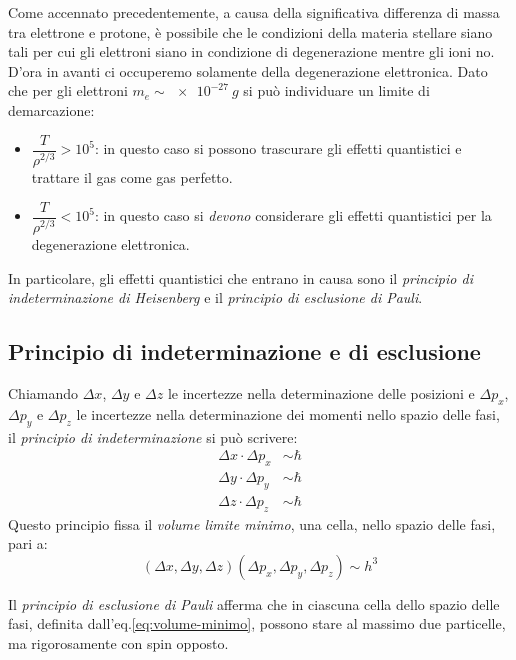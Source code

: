 Come accennato precedentemente, a causa della significativa differenza di massa tra elettrone e protone, è possibile che le condizioni della materia stellare siano tali per cui gli elettroni siano in condizione di degenerazione mentre gli ioni no. D'ora in avanti ci occuperemo solamente della degenerazione elettronica. Dato che per gli elettroni $m_e \sim \SI{e-27}{g}$ si può individuare un limite di demarcazione:
\begin{itemize}
    \item $\dfrac{T}{\rho^{2/3}} > 10^5$: in questo caso si possono trascurare gli effetti quantistici e trattare il gas come gas perfetto.
    \item $\dfrac{T}{\rho^{2/3}} < 10^5$: in questo caso si \emph{devono} considerare gli effetti quantistici per la degenerazione elettronica.
\end{itemize}

In particolare, gli effetti quantistici che entrano in causa sono il \emph{principio di indeterminazione di Heisenberg} e il \emph{principio di esclusione di Pauli}.

\subsection{Principio di indeterminazione e di esclusione}\label{sec:principio-indeterminazione}
Chiamando $\Delta x$, $\Delta y$ e $\Delta z$ le incertezze nella determinazione delle posizioni e $\Delta p_x$, $\Delta p_y$ e $\Delta p_z$ le incertezze nella determinazione dei momenti nello spazio delle fasi, il \emph{principio di indeterminazione} si può scrivere:
\begin{subequations}
\label{eq:principio-indeterminazione}
\begin{align}
\Delta x \cdot \Delta p_x &\sim \hbar \\
\Delta y \cdot \Delta p_y &\sim \hbar \\
\Delta z \cdot \Delta p_z &\sim \hbar 
\end{align}
\end{subequations}
Questo principio fissa il \emph{volume limite minimo}, una cella, nello spazio delle fasi, pari a:
\begin{equation}\label{eq:volume-minimo}
(\Delta x, \Delta y,\Delta z) (\Delta p_x, \Delta p_y, \Delta p_z) \sim h^3
\end{equation}

Il \emph{principio di esclusione di Pauli} afferma che in ciascuna cella dello spazio delle fasi, definita dall'eq.\eqref{eq:volume-minimo}, possono stare al massimo due particelle, ma rigorosamente con spin opposto.

